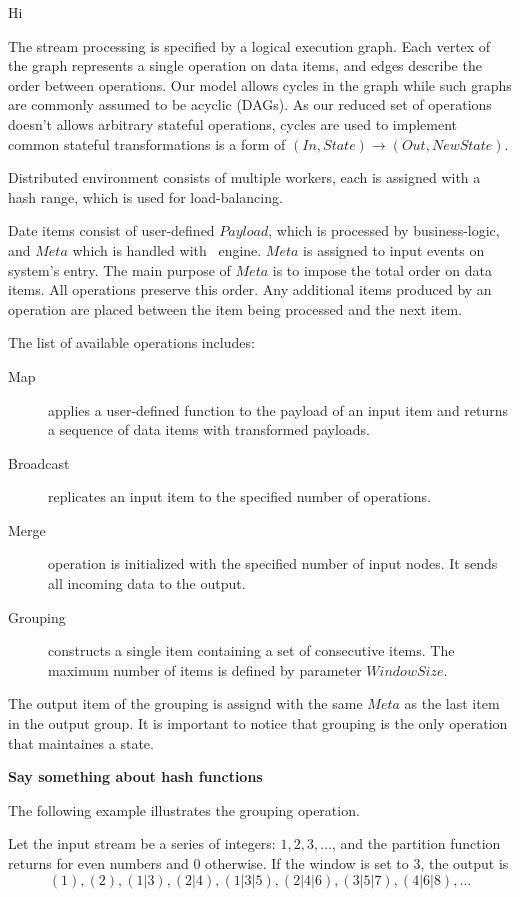 \newpage
Hi
\newpage
\label {fs-short-model}

The stream processing is specified by a logical execution graph. Each vertex of the graph represents a single operation on data items, and edges describe the order between operations. Our model allows cycles in the graph while such graphs are commonly assumed to be acyclic (DAGs). As our reduced set of operations doesn't allows arbitrary stateful operations, cycles are used to implement common stateful transformations is a form of $(In, State) \rightarrow (Out, NewState)$.

Distributed environment consists of multiple workers, each is assigned with a hash range, which is used for load-balancing.

Date items consist of user-defined $Payload$, which is processed by business-logic, and $Meta$ which is handled with \FlameStream\ engine. $Meta$ is assigned to input events on system's entry. The main purpose of $Meta$ is to impose the total order on data items. All operations preserve this order. Any additional items produced by an operation are placed between the item being processed and the next item.

The list of available operations includes:
\begin {description}
  \item [Map] applies a user-defined function to the payload of an input item and returns a sequence of data items with transformed payloads. 
  \item [Broadcast] replicates an input item to the specified number of operations.
  \item [Merge] operation is initialized with the specified number of input nodes. It sends all incoming data to the output.
  \item [Grouping] constructs a single item containing a set of consecutive items. The maximum number of items is defined by parameter $Window Size$. 
\end {description}

The output item of the grouping is assignd with the same $Meta$ as the last item in the output group. It is important to notice that grouping is the only operation that maintaines a state.

{\bf Say something about hash functions}

The following example illustrates the grouping operation. 

Let the input stream be a series of integers: $ 1,2,3, \ldots$, and the  partition function returns for even numbers and 0 otherwise. If the window is set to 3, the output is 
$$(1), (2), (1|3), (2|4), (1|3|5), (2|4|6), (3|5|7), (4|6|8), \ldots$$

